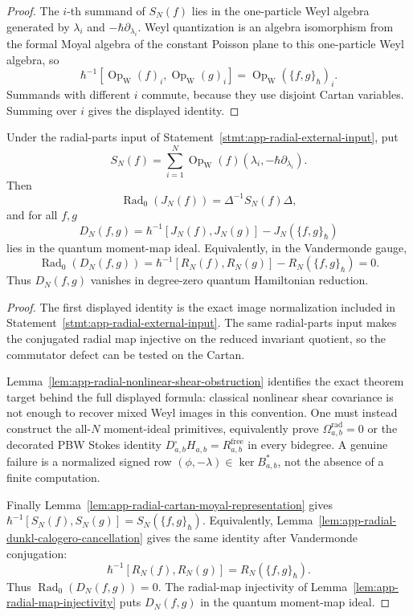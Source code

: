 \begin{proof}
  The \(i\)-th summand of \(S_N(f)\) lies in the one-particle Weyl
  algebra generated by \(\lambda_i\) and
  \(-\hbar\partial_{\lambda_i}\).  Weyl quantization is an algebra
  isomorphism from the formal Moyal algebra of the constant Poisson
  plane to this one-particle Weyl algebra, so
  \[
    \hbar^{-1}[
      \operatorname{Op}_{\mathrm W}(f)_i,
      \operatorname{Op}_{\mathrm W}(g)_i]
    =
    \operatorname{Op}_{\mathrm W}(\{f,g\}_\hbar)_i .
  \]
  Summands with different \(i\) commute, because they use disjoint
  Cartan variables.  Summing over \(i\) gives the displayed identity.
\end{proof}

\begin{thm}
\label{thm:app-radial-finite-N}
  Under the radial-parts input of
  Statement~\ref{stmt:app-radial-external-input}, put
  \[
    S_N(f)=\sum_{i=1}^N
      \operatorname{Op}_{\mathrm W}
      (f)(\lambda_i,-\hbar\partial_{\lambda_i}).
  \]
  Then
  \[
    \operatorname{Rad}_0(J_N(f))=\Delta^{-1}S_N(f)\Delta,
  \]
  and for all \(f,g\)
  \[
    D_N(f,g)=
      \hbar^{-1}[J_N(f),J_N(g)]-J_N(\{f,g\}_\hbar)
  \]
  lies in the quantum moment-map ideal.  Equivalently, in the
  Vandermonde gauge,
  \[
    \operatorname{Rad}_0(D_N(f,g))
      =
      \hbar^{-1}[R_N(f),R_N(g)]-R_N(\{f,g\}_\hbar)
      =0 .
  \]
  Thus \(D_N(f,g)\) vanishes in degree-zero quantum Hamiltonian
  reduction.
\end{thm}

\begin{proof}
  The first displayed identity is the exact image normalization included
  in Statement~\ref{stmt:app-radial-external-input}.  The same
  radial-parts input makes the conjugated radial map injective on the
  reduced invariant quotient, so the commutator defect can be tested on
  the Cartan.

  Lemma~\ref{lem:app-radial-nonlinear-shear-obstruction} identifies the
  exact theorem target behind the full displayed formula: classical
  nonlinear shear covariance is not enough to recover mixed Weyl images
  in this convention.  One must instead construct the all-\(N\)
  moment-ideal primitives, equivalently prove
  \(\Omega^{\mathrm{rad}}_{a,b}=0\) or the decorated PBW Stokes identity
  \(D^\square_{a,b}H_{a,b}=R^{\mathrm{free}}_{a,b}\) in every bidegree.
  A genuine failure is a normalized signed row
  \((\phi,-\lambda)\in\ker B_{a,b}^*\), not the absence of a finite
  computation.

  Finally
  Lemma~\ref{lem:app-radial-cartan-moyal-representation} gives
  \(\hbar^{-1}[S_N(f),S_N(g)]=S_N(\{f,g\}_\hbar)\).  Equivalently,
  Lemma~\ref{lem:app-radial-dunkl-calogero-cancellation} gives the
  same identity after Vandermonde conjugation:
  \[
    \hbar^{-1}[R_N(f),R_N(g)]=R_N(\{f,g\}_\hbar).
  \]
  Thus \(\operatorname{Rad}_0(D_N(f,g))=0\).  The radial-map
  injectivity of Lemma~\ref{lem:app-radial-map-injectivity} puts
  \(D_N(f,g)\) in the quantum moment-map ideal.
\end{proof}

